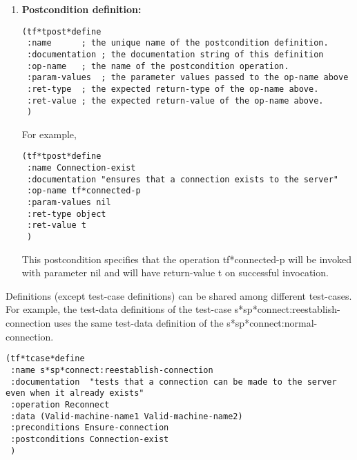 \begin {enumerate}
\noindent For example,

\small\begin{verbatim}
(tf*tpre*define
 :name Ensure-no-connection
 :documentation "ensures that no connection already exists to the server" 
 :op-name tf*no-connection
 :param-values nil
 :ret-type object
 :ret-value t
 )
\end{verbatim}\normalsize

This precondition specifies that the operation tf*no-connection will
be invoked with parameter nil and will have return-value t on successful
invocation.

\item {\bf Postcondition definition:}

\small\begin{verbatim}
(tf*tpost*define
 :name		; the unique name of the postcondition definition.
 :documentation ; the documentation string of this definition
 :op-name 	; the name of the postcondition operation.
 :param-values  ; the parameter values passed to the op-name above
 :ret-type 	; the expected return-type of the op-name above.
 :ret-value	; the expected return-value of the op-name above.
 )
\end{verbatim}\normalsize

\noindent For example,

\small\begin{verbatim}
(tf*tpost*define
 :name Connection-exist
 :documentation "ensures that a connection exists to the server"
 :op-name tf*connected-p
 :param-values nil
 :ret-type object
 :ret-value t
 )
\end{verbatim}\normalsize

This postcondition specifies that the operation tf*connected-p
will be invoked with parameter nil and will have return-value t on
successful invocation.

\end {enumerate}

Definitions (except test-case definitions) can be shared among different
test-cases.
For example, the test-data definitions of the
test-case s*sp*connect:reestablish-connection uses
the same test-data definition of the s*sp*connect:normal-connection.  

\small\begin{verbatim}
(tf*tcase*define
 :name s*sp*connect:reestablish-connection
 :documentation  "tests that a connection can be made to the server even when it already exists"
 :operation Reconnect
 :data (Valid-machine-name1 Valid-machine-name2)
 :preconditions Ensure-connection
 :postconditions Connection-exist
 )
\end{verbatim}\normalsize

